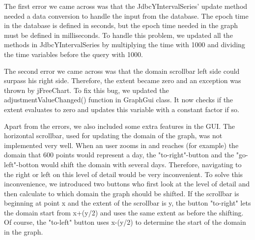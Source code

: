 The first error we came across was that the JdbcYIntervalSeries' update method needed a data conversion to handle the input from the database. The epoch time in the database is defined in seconds, but the epoch time needed in the graph must be defined in milliseconds. To handle this problem, we updated all the methods in JdbcYIntervalSeries by multiplying the time with 1000 and dividing the time variables before the query with 1000.

The second error we came across was that the domain scrollbar left side could surpass his right side. Therefore, the extent became zero and an exception was thrown by jFreeChart. To fix this bug, we updated the adjustmentValueChanged() function in GraphGui class. It now checks if the extent evaluates to zero and updates this variable with a constant factor if so.

Apart from the errors, we also included some extra features in the GUI. The horizontal scrollbar, used for updating the domain of the graph, was not implemented very well. When an user zooms in and reaches (for example) the domain that 600 points would represent a day, the "to-right"-button and the "go-left"-botton would shift the domain with several days. Therefore, navigating to the right or left on this level of detail would be very inconvenient.
To solve this inconvenience, we introduced two buttons who first look at the level of detail and then calculate to which domain the graph should be shifted. If the scrollbar is beginning at point x and the extent of the scrollbar is y, the button "to-right" lets the domain start from x+(y/2) and uses the same extent as before the shifting. Of course, the "to-left" button uses x-(y/2) to determine the start of the domain in the graph.